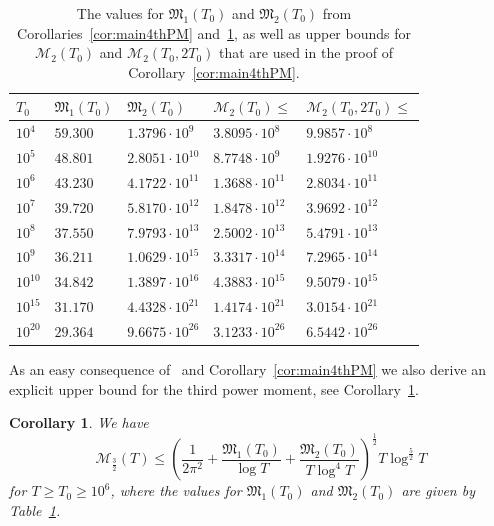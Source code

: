 \documentclass[a4paper,reqno]{amsart}
\newtheorem{corollary}{Corollary}
\theoremstyle{definition}
\begin{document}
\begin{table}[h]
\centering
\footnotesize{
\begin{tabular}{lllll} 
\toprule
$T_0$ & $\mathfrak{M}_{1}(T_0)$ & $\mathfrak{M}_{2}(T_0)$ & $\mathcal{M}_{2}(T_0)\leq$ & $\mathcal{M}_{2}(T_0,2T_0)\leq$ \\ 
\midrule
$10^4$ & $59.300$ & $1.3796\cdot10^{9}$ & $3.8095\cdot10^{8}$ & $9.9857\cdot10^{8}$ \\
$10^5$ & $48.801$ & $2.8051\cdot10^{10}$ & $8.7748\cdot10^{9}$ & $1.9276\cdot10^{10}$ \\
$10^6$ & $43.230$ & $4.1722\cdot10^{11}$ & $1.3688\cdot10^{11}$ & $2.8034\cdot10^{11}$ \\
$10^7$ & $39.720$ & $5.8170\cdot10^{12}$ & $1.8478\cdot10^{12}$ & $3.9692\cdot10^{12}$ \\
$10^8$ & $37.550$ & $7.9793\cdot10^{13}$ & $2.5002\cdot10^{13}$ & $5.4791\cdot10^{13}$ \\
$10^9$ & $36.211$ & $1.0629\cdot10^{15}$ & $3.3317\cdot10^{14}$ & $7.2965\cdot10^{14}$ \\
$10^{10}$ & $34.842$ & $1.3897\cdot10^{16}$ & $4.3883\cdot10^{15}$ & $9.5079\cdot10^{15}$ \\
$10^{15}$ & $31.170$ & $4.4328\cdot10^{21}$ & $1.4174\cdot10^{21}$ & $3.0154\cdot10^{21}$ \\
$10^{20}$ & $29.364$ & $9.6675\cdot10^{26}$ & $3.1233\cdot10^{26}$ & $6.5442\cdot10^{26}$ \\
\bottomrule
\end{tabular}}
\caption{The values for $\mathfrak{M}_1(T_0)$ and $\mathfrak{M}_2(T_0)$ from Corollaries~\ref{cor:main4thPM} and~\ref{cor:main3rdPM}, as well as upper bounds for $\mathcal{M}_{2}(T_0)$ and $\mathcal{M}_{2}(T_0,2T_0)$ that are used in the proof of Corollary~\ref{cor:main4thPM}.} 
\label{tab:CorMain4thPM}
\end{table}

As an easy consequence of~\cite{DonaZunigaAlterman} and Corollary~\ref{cor:main4thPM} we also derive an explicit upper bound for the third power moment, see Corollary~\ref{cor:main3rdPM}.

\begin{corollary}
\label{cor:main3rdPM}
We have
\[
\mathcal{M}_{\frac{3}{2}}(T) \leq \left(\frac{1}{2\pi^2}+\frac{\mathfrak{M}_{1}(T_0)}{\log{T}}+\frac{\mathfrak{M}_{2}(T_0)}{T\log^{4}{T}}\right)^{\frac{1}{2}}T\log^{\frac{5}{2}}{T}
\]
for $T\geq T_0\geq 10^{6}$, where the values for $\mathfrak{M}_{1}(T_0)$ and $\mathfrak{M}_{2}(T_0)$ are given by Table~\ref{tab:CorMain4thPM}.
\end{corollary}
\end{document}
